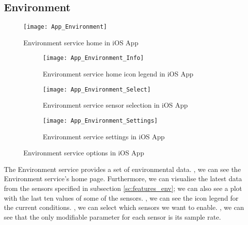 \subsection{Environment}
\begin{figure}[hbt!]
	\centering
	\texttt{[image: App\_Environment]}
	\caption{Environment service home in iOS App}
	\label{fig:app_environment}
\end{figure}
\begin{figure}[hbt!]
	\centering
	\begin{subfigure}{.31\textwidth}
		\centering
		\texttt{[image: App\_Environment\_Info]}
		\caption{Environment service home icon legend in iOS App}
		\label{fig:app_environment_info}
	\end{subfigure}
	\begin{subfigure}{.31\textwidth}
		\centering
		\texttt{[image: App\_Environment\_Select]}
		\caption{Environment service sensor selection in iOS App}
		\label{fig:app_environment_select}
	\end{subfigure}
	\begin{subfigure}{.31\textwidth}
		\centering
		\texttt{[image: App\_Environment\_Settings]}
		\caption{Environment service settings in iOS App}
		\label{fig:app_environment_settings}
	\end{subfigure}
	\caption{Environment service options in iOS App}
	\label{fig:app_environment_options}
\end{figure}
The Environment service provides a set of environmental data.	, we can see the Environment service's home page. Furthermore, we can visualise the latest data from the sensors specified in subsection \ref{sc:features_env}; we can also see a plot with the last ten values of some of the sensors. , we can see the icon legend for the current conditions. , we can select which sensors we want to enable. , we can see that the only modifiable parameter for each sensor is its sample rate.

